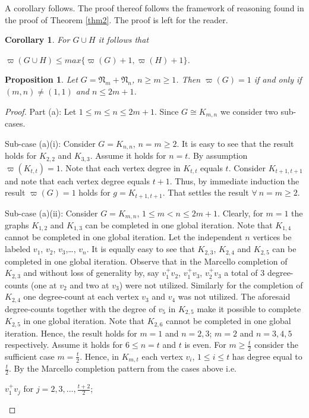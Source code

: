 \documentclass[12pt]{amsart}
\numberwithin{equation}{section}
\newtheorem{proposition}[theorem]{Proposition}
\newtheorem{corollary}[theorem]{Corollary}
\numberwithin{equation}{section}
\begin{document}
A corollary follows. The proof thereof follows the framework of reasoning found in the proof of Theorem \ref{thm2}. The proof is left for the reader.
\begin{corollary}\label{cor2}
For $G \cup H$ it follows that
\begin{center}
$\varpi(G \cup H) \leq max\{\varpi(G)+1,\varpi(H)+1\}$.
\end{center}
\end{corollary} 
\begin{proposition}\label{prop2}
Let $G = \mathfrak{N}_m + \mathfrak{N}_n$, $n \geq m \geq 1$. Then $\varpi(G) = 1$ if and only if $(m,n) \neq (1,1)$ and $ n \leq 2m+1$. 
\end{proposition}
\begin{proof}
Part (a): Let $1 \leq m \leq n \leq 2m+1$. Since $G \cong K_{m,n}$ we consider two sub-cases. 

Sub-case (a)(i): Consider $G = K_{n,n}$, $n = m \geq 2$. It is easy to see that the result holds for $K_{2,2}$ and $K_{3,3}$. Assume it holds for $n = t$. By assumption $\varpi(K_{t,t}) = 1$. Note that each vertex degree in $K_{t,t}$ equals $t$. Consider $K_{t+1,t+1}$ and note that each vertex degree equals $t+1$. Thus, by immediate induction the result $\varpi(G) = 1$ holds for $g = K_{t+1,t+1}$. That settles the result $\forall~ n = m \geq 2$.

Sub-case (a)(ii): Consider $G = K_{m,n}$, $1 \leq m < n \leq 2m+1$. Clearly, for $m = 1$ the graphs $K_{1,2}$ and $K_{1,3}$ can be completed in one global iteration. Note that $K_{1,4}$ cannot be completed in one global iteration. Let the independent $n$ vertices be labeled $v_1$, $v_2$, $v_3$,\dots, $v_n$. It is equally easy to see that $K_{2,3}$, $K_{2,4}$ and $K_{2,5}$ can be completed in one global iteration. Observe that in the Marcello completion of $K_{2,3}$ and without loss of generality by, say $v^+_1v_2$, $v^+_1v_3$, $v^+_2v_3$ a total of $3$ degree-counts (one at $v_2$ and two at $v_3$) were not utilized. Similarly for the completion of $K_{2,4}$ one degree-count at each vertex $v_3$ and $v_4$ was not utilized. The aforesaid degree-counts together with the degree of $v_5$ in $K_{2,5}$ make it possible to complete $K_{2,5}$ in one global iteration. Note that $K_{2,6}$ cannot be completed in one global iteration. Hence, the result holds for $m = 1$ and $n = 2,3$; $m = 2$ and $n = 3,4,5$ respectively. Assume it holds for $6 \leq n = t$ and $t$ is even. For $m \geq \frac{t}{2}$ consider the sufficient case $m = \frac{t}{2}$. Hence, in $K_{m,t}$ each vertex $v_i$, $1 \leq i \leq t$ has degree equal to $\frac{t}{2}$. By the Marcello completion pattern from the cases above i.e. 
\begin{center}
$v^+_1v_j$ for $j = 2,3,\dots,\frac{t+2}{2}$;


\end{center}
\end{proof}
\end{document}
